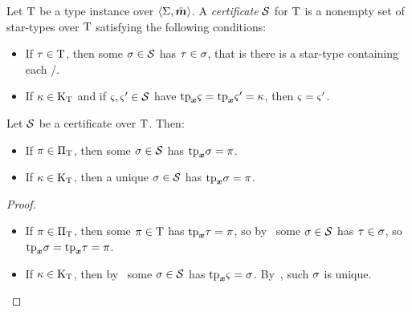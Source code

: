 \begin{definition}
Let $\mathrm{T}$ be a type instance over $\left\langle \mathrm{\Sigma},\bar{\bm{m}} \right\rangle$.
A \emph{certificate} $\mathcal{S}$ for $\mathrm{T}$ is a nonempty set of star-types over
$\mathrm{T}$ satisfying the following conditions:
\begin{itemize}
  \item[\condcertT]\label{cond:certT}
  If $\tau\in\mathrm{T}$, then some $\sigma\in\mathcal{S}$ has $\tau\in\sigma$,
  that is there is a star-type containing each \twotype/.
  \item[\condcertk]\label{cond:certk}
  If $\kappa \in {\mathrm{K}}_{\mathrm{T}}$ and if $\varsigma,{\varsigma'}\in\mathcal{S}$
  have $\mathrm{tp}_{\bm{x}}\varsigma = \mathrm{tp}_{\bm{x}}{\varsigma'} = \kappa$, then $\varsigma = {\varsigma'}$.
\end{itemize}
\end{definition}
\begin{remark}
Let $\mathcal{S}$ be a certificate over $\mathrm{T}$. Then:
\begin{itemize}
  \item[\condcertp]\label{cond:certp}
  If $\pi \in {\Pi}_{\mathrm{T}}$, then some $\sigma\in\mathcal{S}$ has $\mathrm{tp}_{\bm{x}}\sigma = \pi$.
  \item[\condcertku]\label{cond:certku}
  If $\kappa \in {\mathrm{K}}_{\mathrm{T}}$, then a unique $\sigma\in\mathcal{S}$ has $\mathrm{tp}_{\bm{x}}\sigma = \pi$.
\end{itemize}
\end{remark}
\begin{proof}
\begin{itemize}
  \item[\refcondcertp]
  If $\pi\in{\Pi}_{\mathrm{T}}$, then some $\pi\in\mathrm{T}$ has $\mathrm{tp}_{\bm{x}}\tau = \pi$,
  so by~ some $\sigma\in\mathcal{S}$ has $\tau\in\sigma$, so
  $\mathrm{tp}_{\bm{x}}\sigma = \mathrm{tp}_{\bm{x}}\tau = \pi$.
  \item[\refcondcertku]
  If $\kappa\in{\mathrm{K}}_{\mathrm{T}}$, then by~ some $\sigma\in\mathcal{S}$ has
  $\mathrm{tp}_{\bm{x}}\varsigma = \sigma$.
  By~, such $\sigma$ is unique.
\end{itemize}
\end{proof}


